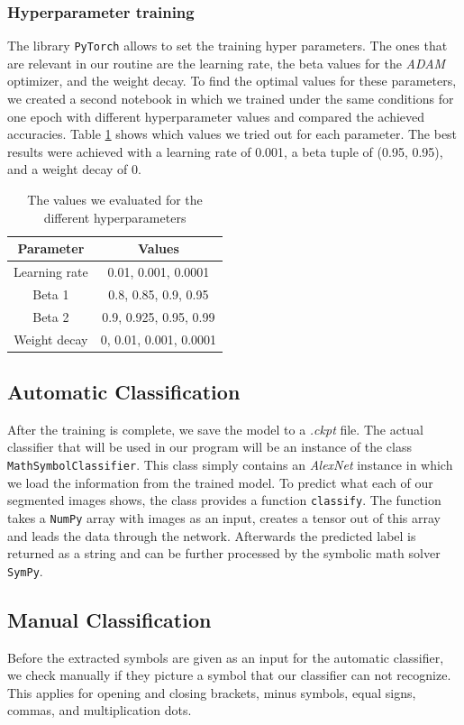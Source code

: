 \documentclass[12pt]{article}
\begin{document}
	\subsubsection{Hyperparameter training}
	The library \texttt{PyTorch} allows to set the training hyper parameters. The ones that are relevant in our routine are the learning rate, the beta values for the \textit{ADAM} optimizer, and the weight decay. To find the optimal values for these parameters, we created a second notebook in which we trained under the same conditions for one epoch with different hyperparameter values and compared the achieved accuracies. Table \ref{tab:hyperparams} shows which values we tried out for each parameter. The best results were achieved with a learning rate of 0.001, a beta tuple of (0.95, 0.95), and a weight decay of 0.
	\begin{table}[h!]
		\begin{tabular}{c|c}
			\textbf{Parameter} & \textbf{Values} \\
			\hline
			Learning rate & 0.01, 0.001, 0.0001 \\
			Beta 1 & 0.8, 0.85, 0.9, 0.95 \\
			Beta 2 & 0.9, 0.925, 0.95, 0.99 \\
			Weight decay & 0, 0.01, 0.001, 0.0001
		\end{tabular}
		\caption{The values we evaluated for the different hyperparameters}
		\label{tab:hyperparams}
	\end{table}
	
	\subsection{Automatic Classification}
	After the training is complete, we save the model to a \textit{.ckpt} file. The actual classifier that will be used in our program will be an instance of the class \texttt{MathSymbolClassifier}. This class simply contains an \textit{AlexNet} instance in which we load the information from the trained model. To predict what each of our segmented images shows, the class provides a function \texttt{classify}. The function takes a \texttt{NumPy} array with images as an input, creates a tensor out of this array and leads the data through the network. Afterwards the predicted label is returned as a string and can be further processed by the symbolic math solver \texttt{SymPy}.
	
	\subsection{Manual Classification}
	Before the extracted symbols are given as an input for the automatic classifier, we check manually if they picture a symbol that our classifier can not recognize. This applies for opening and closing brackets, minus symbols, equal signs, commas, and multiplication dots.
\end{document}
